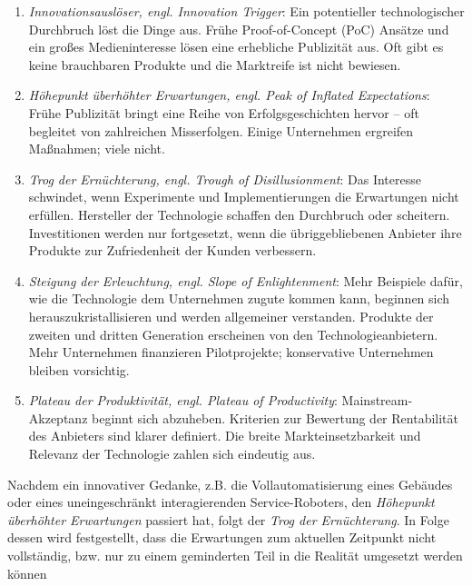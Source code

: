     \begin{enumerate}
        \item \textit{Innovationsauslöser, engl. Innovation Trigger}: Ein potentieller technologischer Durchbruch 
        löst die Dinge aus. Frühe Proof-of-Concept (PoC) Ansätze und ein großes Medieninteresse lösen eine 
        erhebliche Publizität aus. Oft gibt es keine brauchbaren Produkte und die Marktreife ist nicht 
        bewiesen. \cite{gartner.2022m}
        \item \textit{Höhepunkt überhöhter Erwartungen, engl. Peak of Inflated Expectations}: Frühe Publizität 
        bringt eine Reihe von Erfolgsgeschichten hervor – oft begleitet von zahlreichen Misserfolgen. 
        Einige Unternehmen ergreifen Maßnahmen; viele nicht. \cite{gartner.2022m}
        \item \textit{Trog der Ernüchterung, engl. Trough of Disillusionment}: Das Interesse schwindet, wenn 
        Experimente und Implementierungen die Erwartungen nicht erfüllen. Hersteller der Technologie schaffen den Durchbruch 
        oder scheitern. Investitionen werden nur fortgesetzt, wenn die übriggebliebenen Anbieter ihre Produkte 
        zur Zufriedenheit der Kunden verbessern. \cite{gartner.2022m}
        \item \textit{Steigung der Erleuchtung, engl. Slope of Enlightenment}: Mehr Beispiele dafür, wie 
        die Technologie dem Unternehmen zugute kommen kann, beginnen sich herauszukristallisieren und 
        werden allgemeiner verstanden. Produkte der zweiten und dritten Generation erscheinen von den 
        Technologieanbietern. Mehr Unternehmen finanzieren Pilotprojekte; konservative Unternehmen 
        bleiben vorsichtig. \cite{gartner.2022m}
        \item \textit{Plateau der Produktivität, engl. Plateau of Productivity}: Mainstream-Akzeptanz beginnt 
        sich abzuheben. Kriterien zur Bewertung der Rentabilität des Anbieters sind klarer definiert. 
        Die breite Markteinsetzbarkeit und Relevanz der Technologie zahlen sich eindeutig aus. \cite{gartner.2022m}
    \end{enumerate}
    Nachdem ein innovativer Gedanke, z.B. die 
    Vollautomatisierung eines Gebäudes 
    oder eines uneingeschränkt interagierenden Service-Roboters, den \textit{Höhepunkt überhöhter Erwartungen} passiert hat, 
    folgt der \textit{Trog der Ernüchterung}. In Folge dessen wird festgestellt, dass die Erwartungen zum aktuellen Zeitpunkt nicht 
    vollständig, bzw. nur zu einem geminderten Teil in die Realität umgesetzt werden können 
